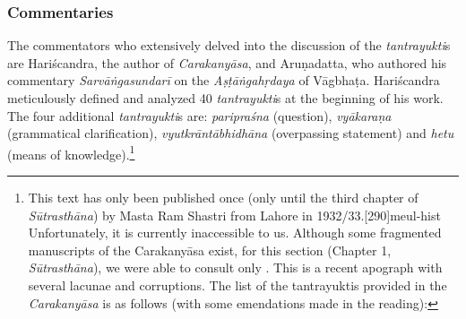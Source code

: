 \subsubsection{Commentaries}\label{commentaries}
The commentators who extensively delved into the discussion of the \emph{tantrayukti}s are Hariścandra, the author of \emph{Carakanyāsa}, and Aruṇadatta, who authored his commentary \emph{Sarvāṅgasundarī} on the \emph{Aṣṭāṅgahṛdaya} of Vāgbhaṭa. Hariścandra meticulously defined and analyzed 40 \emph{tantrayukti}s at the beginning of his work. The four additional \emph{tantrayukti}s are:  \emph{paripraśna} (question), \emph{vyākaraṇa} (grammatical clarification), \emph{vyutkrāntābhidhāna} (overpassing statement) and \emph{hetu} (means of knowledge).\footnote{This text has only been published once 
	(only until the third chapter of \emph{Sūtrasthāna}) by Masta Ram Shastri from Lahore in 1932/33.[290]{meul-hist} Unfortunately, it is currently inaccessible to us. Although some fragmented manuscripts of the Carakanyāsa exist, for this section (Chapter 1, \emph{Sūtrasthāna}), we were able to consult only . This is a recent apograph with several lacunae and corruptions. The list of the tantrayuktis provided in the \emph{Carakanyāsa} is as follows (with some emendations made in the reading): }

